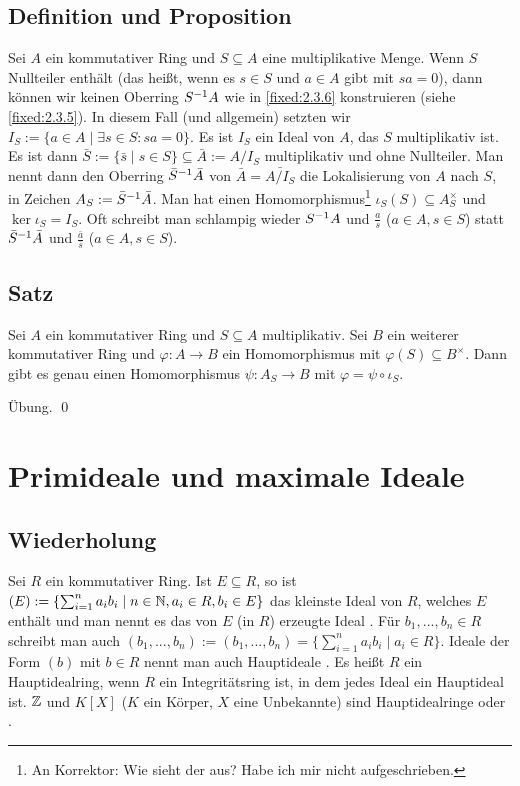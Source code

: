 \subsection{Definition und Proposition} Sei $A$ ein kommutativer Ring und $S \subseteq A$ eine multiplikative Menge. Wenn $S$ Nullteiler enthält (das heißt, wenn es $s \in S$ und $a \in A$ gibt mit $sa=0$), dann können wir keinen Oberring $S^{-1} A$ wie in \ref{fixed:2.3.6} konstruieren (siehe \ref{fixed:2.3.5}). In diesem Fall (und allgemein) setzten wir $I_S := \{a \in A \mid \exists s \in S : sa=0\}$. Es ist $I_S$ ein Ideal von $A$, das $S$ multiplikativ ist. Es ist dann $\bar S := \{\bar s \mid s \in S\} \subseteq \bar A := A/I_S$ multiplikativ und ohne Nullteiler. Man nennt dann den Oberring $\bar S^{-1} \bar A$ von $\bar A = \bar{A/I_S}$ die Lokalisierung von $A$ nach $S$, in Zeichen $A_S := \bar S^{-1} \bar A$. Man hat einen Homomorphismus\footnote{An Korrektor: Wie sieht der aus? Habe ich mir nicht aufgeschrieben.} $\iota_S(S) \subseteq A_S^\times$ und $\ker \iota_S = I_S$. Oft schreibt man schlampig wieder $S^{-1} A$ und $\frac{a}{s}$ ($a \in A, s \in S$) statt $\bar S^{-1} \bar A$ und $\frac{\bar a}{\bar s}$ ($a \in A, s \in S$).

\subsection{Satz} Sei $A$ ein kommutativer Ring und $S \subseteq A$ multiplikativ. Sei $B$ ein weiterer kommutativer Ring und $\varphi: A \to B$ ein Homomorphismus mit $\varphi(S) \subseteq B^\times$. Dann gibt es genau einen Homomorphismus $\psi: A_S \to B$ mit $\varphi = \psi \circ \iota_S$.

\proof Übung. \qed

\section{Primideale und maximale Ideale}

\subsection{Wiederholung} \label{fixed:2.4.1} Sei $R$ ein kommutativer Ring. Ist $E \subseteq R$, so ist $(E) := \{\sum_{i=1}^n a_i b_i \mid n \in \mathbb N, a_i \in R, b_i \in E\}$ das kleinste Ideal von $R$, welches $E$ enthält und man nennt es das von $E$ (in $R$) erzeugte Ideal . Für $b_1,...,b_n \in R$ schreibt man auch $(b_1,...,b_n) := ({b_1,...,b_n}) = \{\sum_{i=1}^n a_i b_i \mid a_i \in R\}$. Ideale der Form $(b)$ mit $b \in R$ nennt man auch Hauptideale . Es heißt $R$ ein Hauptidealring, wenn $R$ ein Integritätsring ist, in dem jedes Ideal ein Hauptideal ist. $\mathbb Z$ und $K[X]$ ($K$ ein Körper, $X$ eine Unbekannte) sind Hauptidealringe  oder \cite[§ 2.2, § 2.4]{Bosch2004}.

